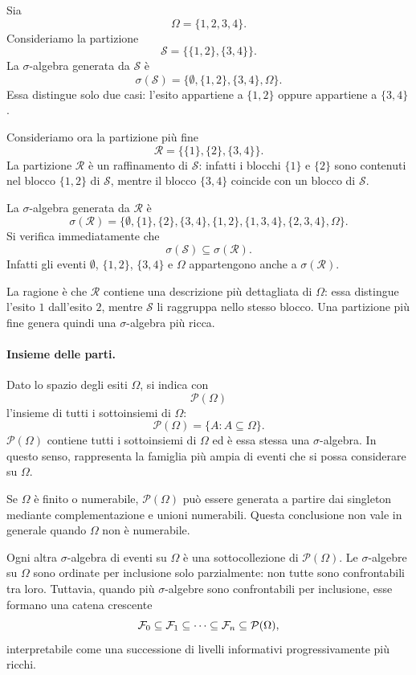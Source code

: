 \begin{example}
Sia
\[
\Omega=\{1,2,3,4\}.
\]
Consideriamo la partizione
\[
\mathcal{S}=\big\{\{1,2\},\{3,4\}\big\}.
\]
La $\sigma$-algebra generata da $\mathcal{S}$ \`{e}
\[
\sigma(\mathcal{S})
=
\big\{
\emptyset,
\{1,2\},
\{3,4\},
\Omega
\big\}.
\]
Essa distingue solo due casi: l'esito appartiene a $\{1,2\}$ oppure appartiene
a $\{3,4\}$.

Consideriamo ora la partizione pi\`{u} fine
\[
\mathcal{R}=\big\{\{1\},\{2\},\{3,4\}\big\}.
\]
La partizione $\mathcal{R}$ \`{e} un raffinamento di $\mathcal{S}$: infatti
i blocchi $\{1\}$ e $\{2\}$ sono contenuti nel blocco $\{1,2\}$ di
$\mathcal{S}$, mentre il blocco $\{3,4\}$ coincide con un blocco di
$\mathcal{S}$.

La $\sigma$-algebra generata da $\mathcal{R}$ \`{e}
\[
\sigma(\mathcal{R})
=
\big\{
\emptyset,
\{1\},
\{2\},
\{3,4\},
\{1,2\},
\{1,3,4\},
\{2,3,4\},
\Omega
\big\}.
\]
Si verifica immediatamente che
\[
\sigma(\mathcal{S})\subseteq\sigma(\mathcal{R}).
\]
Infatti gli eventi $\emptyset$, $\{1,2\}$, $\{3,4\}$ e $\Omega$ appartengono
anche a $\sigma(\mathcal{R})$.

La ragione \`{e} che $\mathcal{R}$ contiene una descrizione pi\`{u} dettagliata
di $\Omega$: essa distingue l'esito $1$ dall'esito $2$, mentre
$\mathcal{S}$ li raggruppa nello stesso blocco. Una partizione pi\`{u} fine
genera quindi una $\sigma$-algebra pi\`{u} ricca.
\end{example}



\paragraph*{Insieme delle parti.}
Dato lo spazio degli esiti $\Omega$, si indica con
\[
\mathcal{P}(\Omega)
\]
l'insieme di tutti i sottoinsiemi di $\Omega$:
\[
\mathcal{P}(\Omega)=\{A:A\subseteq\Omega\}.
\]
$\mathcal{P}(\Omega)$ contiene tutti i sottoinsiemi di $\Omega$ ed \`{e} essa
stessa una $\sigma$-algebra. In questo senso, rappresenta la famiglia pi\`{u}
ampia di eventi che si possa considerare su $\Omega$.

Se $\Omega$ \`{e} finito o numerabile, $\mathcal{P}(\Omega)$ pu\`{o} essere
generata a partire dai singleton mediante complementazione e unioni
numerabili. Questa conclusione non vale in generale quando $\Omega$ non
\`{e} numerabile.

Ogni altra $\sigma$-algebra di eventi su $\Omega$ \`{e} una sottocollezione
di $\mathcal{P}(\Omega)$.
Le $\sigma$-algebre su $\Omega$ sono ordinate per inclusione solo parzialmente:
non tutte sono confrontabili tra loro. Tuttavia, quando pi\`{u} $\sigma$-algebre sono confrontabili per inclusione, esse formano
una catena crescente
\[
\mathcal{F}_0\subseteq\mathcal{F}_1\subseteq\cdots\subseteq\mathcal{F}_n \subseteq \mathcal{P}(\Omega),
\]
interpretabile come una successione di livelli informativi progressivamente
pi\`{u} ricchi. 


